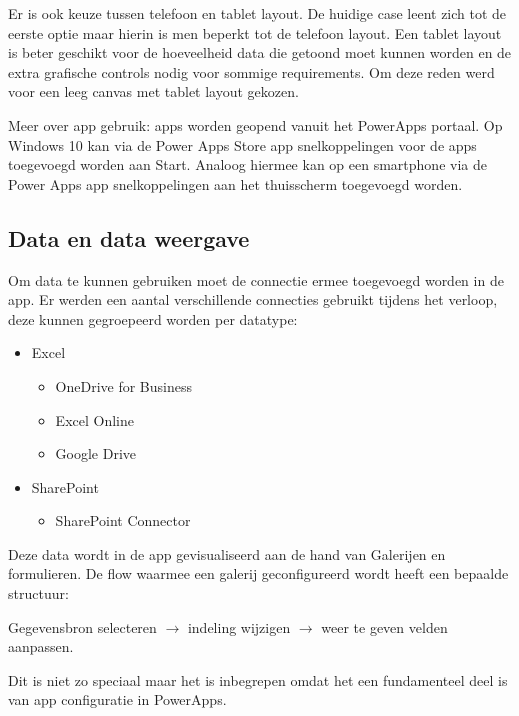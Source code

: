 Er is ook keuze tussen telefoon en tablet layout. De huidige case leent zich tot de eerste optie maar hierin is men beperkt tot de telefoon layout. Een tablet layout is beter geschikt voor de hoeveelheid data die getoond moet kunnen worden en de extra grafische controls nodig voor sommige requirements. Om deze reden werd voor een leeg canvas met tablet layout gekozen.

Meer over app gebruik: apps worden geopend vanuit het PowerApps portaal. Op Windows 10 kan via de Power Apps Store app snelkoppelingen voor de apps toegevoegd worden aan Start. Analoog hiermee kan op een smartphone via de Power Apps app snelkoppelingen aan het thuisscherm toegevoegd worden.

\subsection{Data en data weergave}


Om data te kunnen gebruiken moet de connectie ermee toegevoegd worden in de app. Er werden een aantal verschillende connecties gebruikt tijdens het verloop, deze kunnen gegroepeerd worden per datatype:
\begin{itemize}
    \item Excel
        \begin{itemize}
            \item OneDrive for Business
            \item Excel Online
            \item Google Drive
        \end{itemize}
    \item SharePoint
    \begin{itemize}
        \item SharePoint Connector
    \end{itemize}
\end{itemize}

Deze data wordt in de app gevisualiseerd  aan de hand van Galerijen en formulieren. De flow waarmee een galerij geconfigureerd wordt heeft een bepaalde structuur: 

\hspace{1cm}Gegevensbron selecteren $\rightarrow$ indeling wijzigen $\rightarrow$ weer te geven velden aanpassen. 

Dit is niet zo speciaal maar het is inbegrepen omdat het een fundamenteel deel is van app configuratie in PowerApps.

